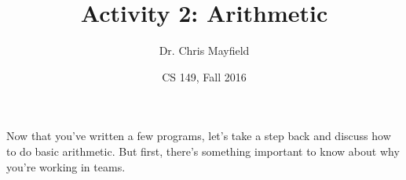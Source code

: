\documentclass[12pt]{article}
\title{Activity 2: Arithmetic}
\author{Dr. Chris Mayfield}
\date{CS 149, Fall 2016}
\begin{document}
\maketitle

Now that you've written a few programs, let's take a step back and discuss how to do basic arithmetic.
But first, there's something important to know about why you're working in teams.





\end{document}

